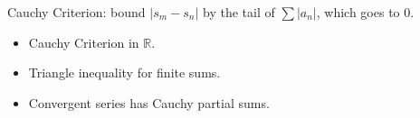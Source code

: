 \begin{remark*}
Cauchy Criterion: bound $|s_m - s_n|$ by the tail of $\sum |a_n|$, which goes to 0.
\end{remark*}

\begin{remark*}[Dependencies]
\begin{itemize}
  \item Cauchy Criterion in $\mathbb{R}$.
  \item Triangle inequality for finite sums.
  \item Convergent series has Cauchy partial sums.
\end{itemize}
\end{remark*}
